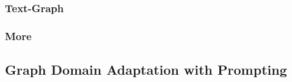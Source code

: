\subsubsection{Text-Graph}

\subsubsection{More}




\subsection{Graph Domain Adaptation with Prompting}\label{subsec:pdomain}













\subsection{}\label{subsec:discussion}



